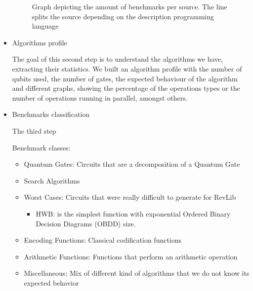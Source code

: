 \begin{itemize}
\begin{figure}
\centering
{}
\label{fig:benchmarks_graph}
\caption{Graph depicting the amount of benchmarks per source. The line splits the source depending on the description programming language}
\end{figure}

\item Algorithms profile
\label{sec:org50754a6}

The goal of this second step is to understand the algorithms we have, extracting their statistics.
We built an algorithm profile with the number of qubits used, the number of gates, the expected behaviour of the algorithm and different graphs, showing the percentage of the operations types or the number of operations running in parallel, amongst others.

\item Benchmarks classification
\label{sec:orgd1f339e}

The third step 

Benchmark classes:

\begin{itemize}
\item Quantum Gates: Circuits that are a decomposition of a Quantum Gate
\item Search Algorithms
\item Worst Cases: Circuits that were really difficult to generate for RevLib
\begin{itemize}
\item HWB: is the simplest function with exponential Ordered Binary Decision Diagrams (OBDD) size.
\end{itemize}
\item Encoding Functions: Classical codification functions
\item Arithmetic Functions: Functions that perform an arithmetic operation
\item Miscellaneous: Mix of different kind of algorithms that we do not know its expected behavior
\end{itemize}



\end{itemize}
